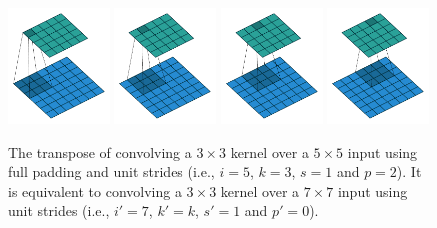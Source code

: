 \documentclass[notitlepage]{report}
\begin{document}
\begin{figure}[p]
    \centering
    \includegraphics[width=0.24\textwidth]{pdf/full_padding_no_strides_transposed_00.pdf}
    \includegraphics[width=0.24\textwidth]{pdf/full_padding_no_strides_transposed_01.pdf}
    \includegraphics[width=0.24\textwidth]{pdf/full_padding_no_strides_transposed_02.pdf}
    \includegraphics[width=0.24\textwidth]{pdf/full_padding_no_strides_transposed_03.pdf}
    \caption{\label{fig:full_padding_no_strides_transposed} The transpose of
        convolving a $3 \times 3$ kernel over a $5 \times 5$ input using full
        padding and unit strides (i.e., $i = 5$, $k = 3$, $s = 1$ and $p = 2$).
        It is equivalent to convolving a $3 \times 3$ kernel over a $7 \times 7$
        input using unit strides (i.e., $i' = 7$, $k' = k$, $s' = 1$ and $p' =
        0$).}
\end{figure}
\end{document}
